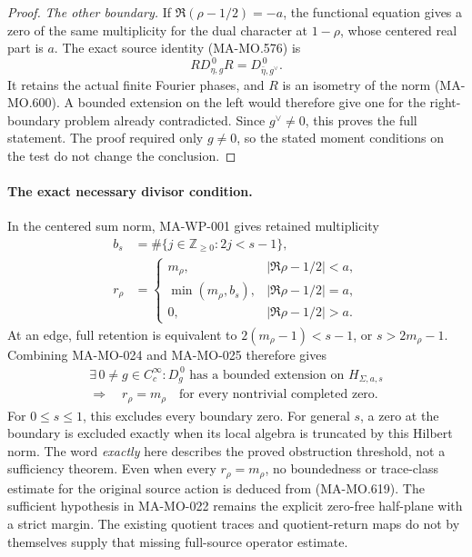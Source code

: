 \begin{proof}
\emph{The other boundary.}
If \(\Re(\rho-1/2)=-a\), the functional equation gives
a zero of the same multiplicity for the dual character
at \(1-\rho\), whose centered real part is \(a\).
The exact source identity (MA-MO.576) is
\[
       R D_{\eta,g}^{\,0}R=D_{\bar\eta,g^\vee}^{\,0}.
 \tag{MA-MO.617}
\]
It retains the actual finite Fourier phases, and \(R\)
is an isometry of the norm (MA-MO.600).
A bounded extension on the left would therefore give
one for the right-boundary problem already contradicted.
Since \(g^\vee\ne0\), this proves the full statement.
The proof required only \(g\ne0\), so the stated moment
conditions on the test do not change the conclusion.
\end{proof}

\paragraph{The exact necessary divisor condition.}
In the centered sum norm, MA-WP-001 gives retained
multiplicity
\[
 \begin{aligned}
 b_s&=\#\{j\in\mathbb Z_{\ge0}:2j<s-1\},\\
 r_\rho&=
 \begin{cases}
 m_\rho,&|\Re\rho-1/2|<a,\\
 \min(m_\rho,b_s),&|\Re\rho-1/2|=a,\\
 0,&|\Re\rho-1/2|>a .
 \end{cases}
 \end{aligned}
 \tag{MA-MO.618}
\]
At an edge, full retention is equivalent to
\(2(m_\rho-1)<s-1\), or \(s>2m_\rho-1\).
Combining MA-MO-024 and MA-MO-025 therefore gives
\[
 \begin{gathered}
 \exists\,0\ne g\in C_c^\infty:
 D_g^{\,0}\text{ has a bounded extension on }H_{\Sigma,a,s}\\
 \Longrightarrow\quad
 r_\rho=m_\rho\quad\text{for every nontrivial completed zero}.
 \end{gathered}
 \tag{MA-MO.619}
\]
For \(0\le s\le1\), this excludes every boundary zero.
For general \(s\), a zero at the boundary is excluded
exactly when its local algebra is truncated by this
Hilbert norm. The word \emph{exactly} here describes the
proved obstruction threshold, not a sufficiency theorem.
Even when every \(r_\rho=m_\rho\), no boundedness or
trace-class estimate for the original source action is
deduced from (MA-MO.619).
The sufficient hypothesis in MA-MO-022 remains the
explicit zero-free half-plane with a strict margin.
The existing quotient traces and quotient-return maps
do not by themselves supply that missing full-source
operator estimate.

